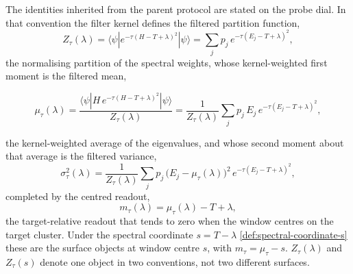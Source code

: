 The identities inherited from the parent protocol are stated on the probe dial. In that convention the filter kernel defines the filtered partition function,
\begin{equation}\label{def:filtered-partition}
Z_\tau(\lambda)=\langle\psi|e^{-\tau(H-T+\lambda)^{2}}|\psi\rangle=\sum_j p_j\,e^{-\tau(E_j-T+\lambda)^{2}},
\end{equation}
the normalising partition of the spectral weights, whose kernel-weighted first moment is the filtered mean,
\begin{widetext}
\begin{equation}\label{def:filtered-mean}
\mu_\tau(\lambda)=\frac{\langle\psi|H\,e^{-\tau(H-T+\lambda)^{2}}|\psi\rangle}{Z_\tau(\lambda)}=\frac{1}{Z_\tau(\lambda)}\sum_j p_j\,E_j\,e^{-\tau(E_j-T+\lambda)^{2}},
\end{equation}
\end{widetext}
the kernel-weighted average of the eigenvalues, and whose second moment about that average is the filtered variance,
\begin{equation}\label{def:filtered-variance}
\sigma_\tau^{2}(\lambda)=\frac{1}{Z_\tau(\lambda)}\sum_j p_j\,\bigl(E_j-\mu_\tau(\lambda)\bigr)^{2}\,e^{-\tau(E_j-T+\lambda)^{2}},
\end{equation}
completed by the centred readout,
\begin{equation}\label{def:centered-readout}
m_\tau(\lambda)=\mu_\tau(\lambda)-T+\lambda,
\end{equation}
the target-relative readout that tends to zero when the window centres on the target cluster. Under the spectral coordinate $s=T-\lambda$ \eqref{def:spectral-coordinate-s} these are the surface objects at window centre $s$, with $m_\tau=\mu_\tau-s$. $Z_\tau(\lambda)$ and $Z_\tau(s)$ denote one object in two conventions, not two different surfaces.

